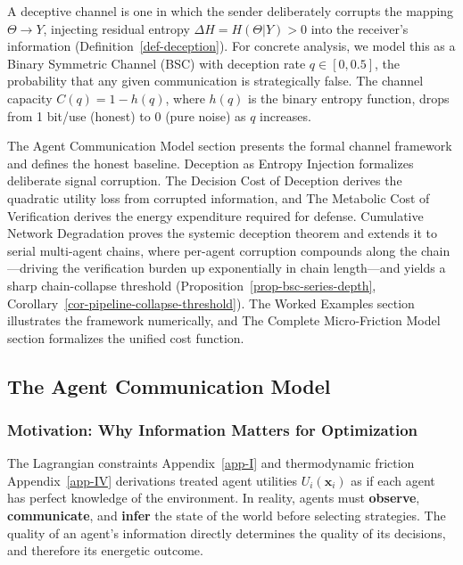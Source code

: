 \documentclass[11pt]{article}
\theoremstyle{plain}
\theoremstyle{definition}
\theoremstyle{remark}
\let\origsubsection\subsection
\renewcommand{\subsection}{\needspace{7\baselineskip}\origsubsection}
\let\origsubsubsection\subsubsection
\renewcommand{\subsubsection}{\needspace{4\baselineskip}\origsubsubsection}
\begin{document}
A deceptive channel is one in which the sender deliberately corrupts the
mapping \(\Theta \to Y\), injecting residual entropy
\(\Delta H = H(\Theta | Y) > 0\) into the receiver's information
(Definition~\ref{def-deception}). For concrete analysis, we model this
as a Binary Symmetric Channel (BSC) with deception rate
\(q \in [0, 0.5]\), the probability that any given communication is
strategically false. The channel capacity \(C(q) = 1 - h(q)\), where
\(h(q)\) is the binary entropy function, drops from 1 bit/use (honest)
to 0 (pure noise) as \(q\) increases.

The Agent Communication Model section presents the formal channel
framework and defines the honest baseline. Deception as Entropy
Injection formalizes deliberate signal corruption. The Decision Cost of
Deception derives the quadratic utility loss from corrupted information,
and The Metabolic Cost of Verification derives the energy expenditure
required for defense. Cumulative Network Degradation proves the systemic
deception theorem and extends it to serial multi-agent chains, where
per-agent corruption compounds along the chain---driving the
verification burden up exponentially in chain length---and yields a
sharp chain-collapse threshold (Proposition~\ref{prop-bsc-series-depth},
Corollary~\ref{cor-pipeline-collapse-threshold}). The Worked Examples
section illustrates the framework numerically, and The Complete
Micro-Friction Model section formalizes the unified cost function.

\subsection{The Agent Communication
Model}\label{the-agent-communication-model}

\subsubsection{Motivation: Why Information Matters for
Optimization}\label{motivation-why-information-matters-for-optimization}

The Lagrangian constraints Appendix~\ref{app-I} and thermodynamic
friction Appendix~\ref{app-IV} derivations treated agent utilities
\(U_i(\mathbf{x}_i)\) as if each agent has perfect knowledge of the
environment. In reality, agents must \textbf{observe},
\textbf{communicate}, and \textbf{infer} the state of the world before
selecting strategies. The quality of an agent's information directly
determines the quality of its decisions, and therefore its energetic
outcome.
\end{document}
